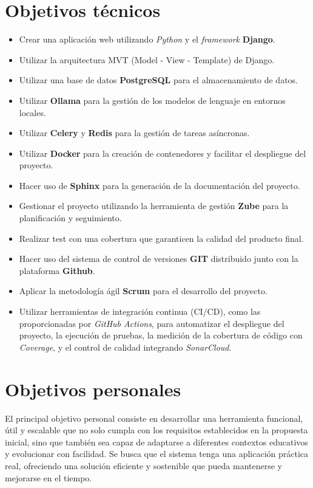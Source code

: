 \section{Objetivos técnicos}\label{objetivos_tecnicos}
\begin{itemize}
    \item Crear una aplicación web utilizando \textit{Python} y el \textit{framework} \textbf{Django}.
    \item Utilizar la arquitectura MVT (Model - View - Template) de Django.
    \item Utilizar una base de datos \textbf{PostgreSQL} para el almacenamiento de datos.
    \item Utilizar \textbf{Ollama} para la gestión de los modelos de lenguaje en entornos locales.
    \item Utilizar \textbf{Celery} y \textbf{Redis} para la gestión de tareas asíncronas.
    \item Utilizar \textbf{Docker} para la creación de contenedores y facilitar el despliegue del proyecto.
    \item Hacer uso de \textbf{Sphinx} para la generación de la documentación del proyecto.
    \item Gestionar el proyecto utilizando la herramienta de gestión \textbf{Zube} para la planificación y seguimiento.
    \item Realizar test con una cobertura que garanticen la calidad del producto final.
    \item Hacer uso del sistema de control de versiones \textbf{GIT} distribuido junto con la plataforma \textbf{Github}.
    \item Aplicar la metodología ágil \textbf{Scrum} para el desarrollo del proyecto.
    \item Utilizar herramientas de integración continua (CI/CD), como las proporcionadas por \textit{GitHub Actions}, para automatizar el despliegue del proyecto, la ejecución de pruebas, la medición de la cobertura de código con \textit{Coverage}, y el control de calidad integrando \textit{SonarCloud}.
\end{itemize}

\section{Objetivos personales}\label{objetivos_personasles}

El principal objetivo personal consiste en desarrollar una herramienta funcional, útil y escalable que no solo cumpla con los requisitos establecidos en la propuesta inicial, sino que también sea capaz de adaptarse a diferentes contextos educativos y evolucionar con facilidad. Se busca que el sistema tenga una aplicación práctica real, ofreciendo una solución eficiente y sostenible que pueda mantenerse y mejorarse en el tiempo.

